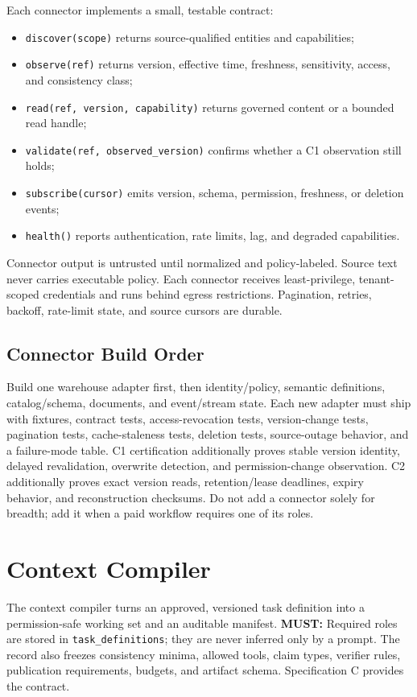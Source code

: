 \documentclass[10pt]{article}
\newcommand{\code}[1]{\texttt{#1}}
\newcommand{\must}{\textbf{\textcolor{amosblue}{MUST:}}\xspace}
\begin{document}
Each connector implements a small, testable contract:
\begin{itemize}
  \item \code{discover(scope)} returns source-qualified entities and capabilities;
  \item \code{observe(ref)} returns version, effective time, freshness, sensitivity, access, and consistency class;
  \item \code{read(ref, version, capability)} returns governed content or a bounded read handle;
  \item \code{validate(ref, observed\_version)} confirms whether a C1 observation still holds;
  \item \code{subscribe(cursor)} emits version, schema, permission, freshness, or deletion events;
  \item \code{health()} reports authentication, rate limits, lag, and degraded capabilities.
\end{itemize}

Connector output is untrusted until normalized and policy-labeled. Source text never carries executable policy. Each connector receives least-privilege, tenant-scoped credentials and runs behind egress restrictions. Pagination, retries, backoff, rate-limit state, and source cursors are durable.

\subsection{Connector Build Order}

Build one warehouse adapter first, then identity/policy, semantic definitions, catalog/schema, documents, and event/stream state. Each new adapter must ship with fixtures, contract tests, access-revocation tests, version-change tests, pagination tests, cache-staleness tests, deletion tests, source-outage behavior, and a failure-mode table. C1 certification additionally proves stable version identity, delayed revalidation, overwrite detection, and permission-change observation. C2 additionally proves exact version reads, retention/lease deadlines, expiry behavior, and reconstruction checksums. Do not add a connector solely for breadth; add it when a paid workflow requires one of its roles.

\section{Context Compiler}

The context compiler turns an approved, versioned task definition into a permission-safe working set and an auditable manifest. \must Required roles are stored in \code{task\_definitions}; they are never inferred only by a prompt. The record also freezes consistency minima, allowed tools, claim types, verifier rules, publication requirements, budgets, and artifact schema. Specification C provides the contract.
\end{document}
